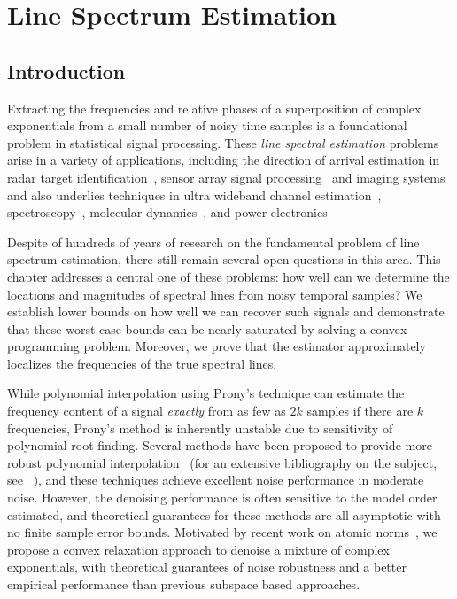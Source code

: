 \chapter{Line Spectrum Estimation}

\section{Introduction}

Extracting the frequencies and relative phases of a superposition of complex
exponentials from a small number of noisy time samples is a foundational problem
in statistical signal processing. These \emph{line spectral estimation} problems
arise in a variety of applications, including the direction of arrival
estimation in radar target identification~\cite{radar}, sensor array signal
processing~\cite{arrays} and imaging systems~\cite{imaging} and also underlies
techniques in ultra wideband channel estimation~\cite{uwb},
spectroscopy~\cite{nmr}, molecular dynamics~\cite{andrade2012}, and power
electronics~\cite{power}


Despite of hundreds of years of research on the fundamental problem of line
spectrum estimation, there still remain several open questions in this area.
This chapter addresses a central one of these problems: how well can we
determine the locations and magnitudes of spectral lines from noisy temporal
samples? We establish lower bounds on how well we can recover such signals and
demonstrate that these worst case bounds can be nearly saturated by solving a
convex programming problem. Moreover, we prove that the estimator approximately
localizes the frequencies of the true spectral lines.

While polynomial interpolation using Prony's technique can estimate the
frequency content of a signal \emph{exactly} from as few as $2k$ samples if
there are $k$ frequencies, Prony's method is inherently unstable due to
sensitivity of polynomial root finding. Several methods have been proposed to
provide more robust polynomial interpolation~\cite{music,esprit,hua02} (for an
extensive bibliography on the subject, see ~\cite{stoica93}), and these
techniques achieve excellent noise performance in moderate noise. However, the
denoising performance is often sensitive to the model order estimated, and
theoretical guarantees for these methods are all asymptotic with no finite
sample error bounds. Motivated by recent work on atomic norms~\cite{crpw}, we
propose a convex relaxation approach to denoise a mixture of complex
exponentials, with theoretical guarantees of noise robustness and a better
empirical performance than previous subspace based approaches.


